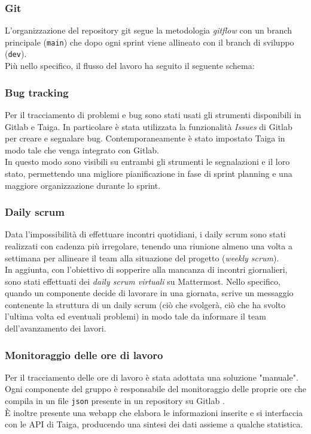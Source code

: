 \documentclass[11pt]{article}
\begin{document}
\subsubsection{Git}
L'organizzazione del repository git segue la metodologia \textit{gitflow} con un branch principale (\texttt{main}) che dopo ogni sprint viene allineato
con il branch di sviluppo (\texttt{dev}).\\
Più nello specifico, il flusso del lavoro ha seguito il seguente schema:


\subsubsection{Bug tracking}
Per il tracciamento di problemi e bug sono stati usati gli strumenti disponibili in Gitlab e Taiga.
In particolare è stata utilizzata la funzionalità \textit{Issues} di Gitlab per creare e segnalare bug. 
Contemporaneamente è stato impostato Taiga in modo tale che venga integrato con Gitlab.\\
In questo modo sono visibili su entrambi gli strumenti le segnalazioni e il loro stato, permettendo una migliore pianificazione in fase di sprint planning e
una maggiore organizzazione durante lo sprint.

\subsubsection{Daily scrum}
Data l'impossibilità di effettuare incontri quotidiani, i daily scrum sono stati realizzati con cadenza più irregolare, tenendo una riunione almeno una volta a settimana
per allineare il team alla situazione del progetto (\textit{weekly scrum}).\\
In aggiunta, con l'obiettivo di sopperire alla mancanza di incontri giornalieri, sono stati effettuati dei \textit{daily scrum virtuali} su Mattermost.
Nello specifico, quando un componente decide di lavorare in una giornata, scrive un messaggio contenente la struttura di un daily scrum (ciò che svolgerà, ciò che ha svolto l'ultima volta ed eventuali problemi)
in modo tale da informare il team dell'avanzamento dei lavori.

\subsubsection{Monitoraggio delle ore di lavoro}
Per il tracciamento delle ore di lavoro è stata adottata una soluzione "manuale".
Ogni componente del gruppo è responsabile del monitoraggio delle proprie ore che compila in un file \texttt{json} presente in un repository su Gitlab \cite{timetracker_git}.\\
È inoltre presente una webapp \cite{timetracker} che elabora le informazioni inserite e si interfaccia con le API di Taiga, 
producendo una sintesi dei dati assieme a qualche statistica. 
\end{document}
